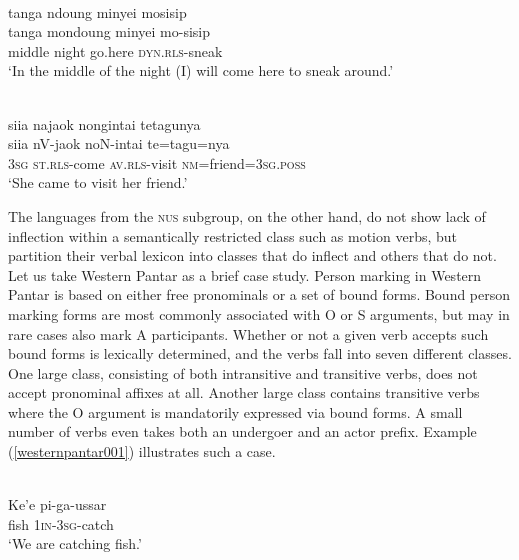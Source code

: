 \ea \label{tajio001}
\\
\glll tanga ndoung minyei mosisip \\
tanga mondoung minyei mo-sisip \\
middle night go.here \textsc{dyn}.\textsc{rls}-sneak \\
\glft `In the middle of the night (I) will come here to sneak around.’\\ 
\z

\ea \label{tajio002}
\\
\glll siia najaok nongintai tetagunya \\
siia nV-jaok noN-intai te=tagu=nya \\
\textsc{3}\textsc{sg} \textsc{st}.\textsc{rls}-come \textsc{av}.\textsc{rls}-visit \textsc{nm}=friend=\textsc{3}\textsc{sg}.\textsc{poss} \\
\glft `She came to visit her friend.’\\ 
\z

The languages from the \textsc{nus} subgroup, on the other hand, do not show lack of inflection within a semantically restricted class such as motion verbs, but partition their verbal lexicon into classes that do inflect and others that do not. Let us take Western Pantar \citep{holton2010person, holton2014western} as a brief case study. Person marking in Western Pantar is based on either free pronominals or a set of bound forms. Bound person marking forms are most commonly associated with O or S arguments, but may in rare cases also mark A participants. Whether or not a given verb accepts such bound forms is lexically determined, and the verbs fall into seven different classes. One large class, consisting of both intransitive and transitive verbs, does not accept pronominal affixes at all. Another large class contains transitive verbs where the O argument is mandatorily expressed via bound forms. A small number of verbs even takes both an undergoer and an actor prefix. Example (\ref{westernpantar001}) illustrates such a case.

\ea \label{westernpantar001}
\\
\gll Ke'e pi-ga-ussar \\
fish 1\textsc{in}-3\textsc{sg}-catch \\
\glft `We are catching fish.'\\ 
\z


